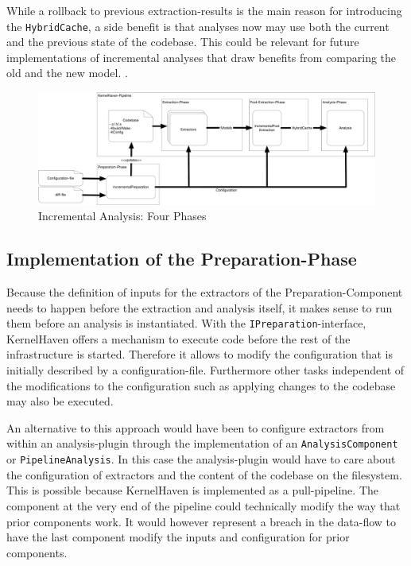 \documentclass[a4paper]{article}
\begin{document}
While a rollback to previous extraction-results is the main reason for introducing the \texttt{HybridCache}, a side benefit is that analyses now may use both the current and the previous state of the codebase. This could be relevant for future implementations of incremental analyses that draw benefits from comparing the old and the new model. .

\begin{figure}[h] 
  \centering
  \begin{minipage}[b]{1\textwidth} 
    \caption[Incremental Analysis: Four Phases]{Incremental Analysis: Four Phases}\label{4-phases}
    \includegraphics[width=1\textwidth]{img/KernelHavenIncremental.pdf}
  \end{minipage}
\end{figure}



\subsection{Implementation of the Preparation-Phase}\label{preparation-phase}

Because the definition of inputs for the extractors of the Preparation-Component needs to happen before the extraction and analysis itself, it makes sense to run them before an analysis is instantiated. With the \texttt{IPreparation}-interface, KernelHaven offers a mechanism to execute code before the rest of the infrastructure is started. Therefore it allows to modify the configuration that is initially described by a configuration-file. Furthermore other tasks independent of the modifications to the configuration such as applying changes to the codebase may also be executed.

An alternative to this approach would have been to configure extractors from within an analysis-plugin through the implementation of an \texttt{AnalysisComponent} or \texttt{PipelineAnalysis}. In this case the analysis-plugin would have to care about the configuration of extractors and the content of the codebase on the filesystem. This is possible because KernelHaven is implemented as a pull-pipeline. The component at the very end of the pipeline could technically modify the way that prior components work. It would however represent a breach in the data-flow to have the last component modify the inputs and configuration for prior  components. 
\end{document}

